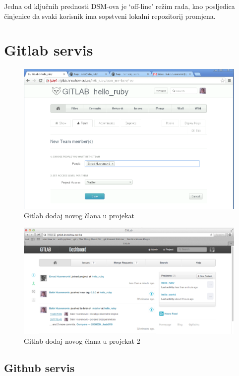 \documentclass[times, utf8, seminar]{fit}
\begin{document}
Jedna od ključnih prednosti DSM-ova je `off-line' režim rada, kao posljedica činjenice da svaki korisnik ima sopstveni lokalni repozitorij promjena.

\chapter{Gitlab servis}
\vspace*{-0.7cm}

\begin{figure}[H]
\centering
\includegraphics[width=15cm]{img/gitlab_add_new_member_to_project.png}
\caption{Gitlab dodaj novog člana u projekat}
\end{figure}


\begin{figure}[H]
\centering
\includegraphics[width=15cm]{img/gitlab_add_new_member_to_project_2.png}
\caption{Gitlab dodaj novog člana u projekat 2}
\end{figure}

\section{Github servis}
\end{document}

